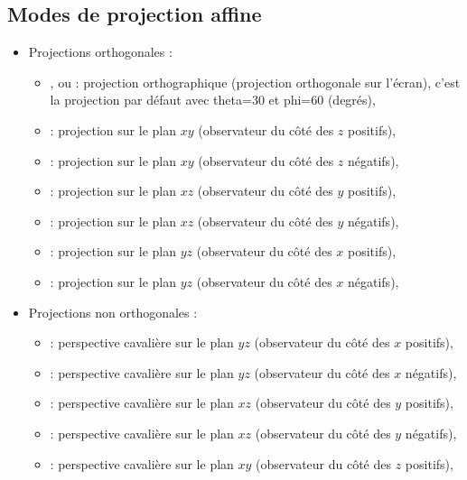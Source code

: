 \subsection{Modes de projection affine}

\begin{itemize}
    \item Projections orthogonales :
        \begin{itemize}
            \item {}, ou  : projection orthographique (projection orthogonale sur l'écran), c'est la projection par défaut avec theta=30 et phi=60 (degrés),
            \item {} : projection sur le plan $xy$ (observateur du côté des $z$ positifs),
            \item {} : projection sur le plan $xy$ (observateur du côté des $z$ négatifs),
            \item {} : projection sur le plan $xz$ (observateur du côté des $y$ positifs),
            \item {} : projection sur le plan $xz$ (observateur du côté des $y$ négatifs),
            \item {} : projection sur le plan $yz$ (observateur du côté des $x$ positifs),
            \item {} : projection sur le plan $yz$ (observateur du côté des $x$ négatifs),
        \end{itemize}
    \item Projections non orthogonales :
        \begin{itemize}
            \item {} : perspective cavalière sur le plan $yz$ (observateur du côté des $x$ positifs),
             \item {} : perspective cavalière sur le plan $yz$ (observateur du côté des $x$ négatifs),
            \item {} : perspective cavalière sur le plan $xz$ (observateur du côté des $y$ positifs),
            \item {} : perspective cavalière sur le plan $xz$ (observateur du côté des $y$ négatifs),
            \item {} : perspective cavalière sur le plan $xy$ (observateur du côté des $z$ positifs),

\end{itemize}
\end{itemize}
